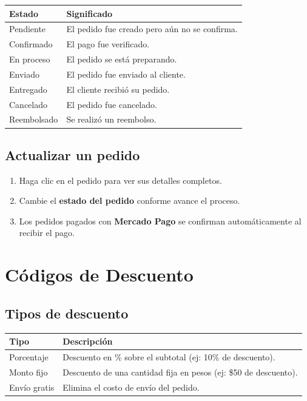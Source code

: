 \documentclass[12pt,a4paper]{article}
\begin{document}
\begin{table}[h]
\centering
\begin{tabularx}{\textwidth}{lX}
    \toprule
    \textbf{Estado} & \textbf{Significado} \\
    \midrule
    Pendiente    & El pedido fue creado pero aún no se confirma. \\
    Confirmado   & El pago fue verificado. \\
    En proceso   & El pedido se está preparando. \\
    Enviado      & El pedido fue enviado al cliente. \\
    Entregado    & El cliente recibió su pedido. \\
    Cancelado    & El pedido fue cancelado. \\
    Reembolsado  & Se realizó un reembolso. \\
    \bottomrule
\end{tabularx}
\end{table}

\subsection{Actualizar un pedido}
\begin{enumerate}[leftmargin=2cm]
    \item Haga clic en el pedido para ver sus detalles completos.
    \item Cambie el \textbf{estado del pedido} conforme avance el proceso.
    \item Los pedidos pagados con \textbf{Mercado Pago} se confirman automáticamente al recibir el pago.
\end{enumerate}

\section{Códigos de Descuento}

\subsection{Tipos de descuento}

\begin{table}[h]
\centering
\begin{tabularx}{\textwidth}{lX}
    \toprule
    \textbf{Tipo} & \textbf{Descripción} \\
    \midrule
    Porcentaje       & Descuento en \% sobre el subtotal (ej: 10\% de descuento). \\
    Monto fijo       & Descuento de una cantidad fija en pesos (ej: \$50 de descuento). \\
    Envío gratis     & Elimina el costo de envío del pedido. \\
    \bottomrule
\end{tabularx}
\end{table}
\end{document}
